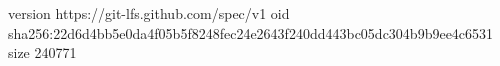 version https://git-lfs.github.com/spec/v1
oid sha256:22d6d4bb5e0da4f05b5f8248fec24e2643f240dd443bc05dc304b9b9ee4c6531
size 240771
